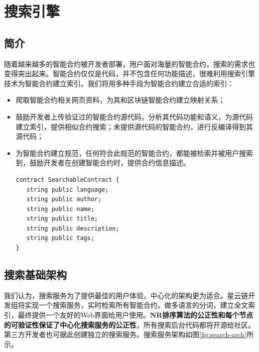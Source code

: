 \section{搜索引擎}
\label{sec:search}

\subsection{简介}

随着越来越多的智能合约被开发者部署，用户面对海量的智能合约，搜索的需求也变得突出起来。智能合约仅仅是代码，并不包含任何功能描述，很难利用搜索引擎技术为智能合约建立索引。我们将用多种手段为智能合约建立合适的索引：
\begin{itemize}
	\item 爬取智能合约相关网页资料，为其和区块链智能合约建立映射关系；
	\item 鼓励开发者上传验证过的智能合约源代码，分析其代码功能和语义，为源代码建立索引，提供相似合约搜索；未提供源代码的智能合约，进行反编译得到其源代码；
	\item 为智能合约建立规范，任何符合此规范的智能合约，都能被检索并被用户搜索到，鼓励开发者在创建智能合约时，提供合约信息描述。
	\begin{lstlisting}[frame=single]
contract SearchableContract {
   string public language;
   string public author;
   string public name;
   string public title;
   string public description;
   string public tags;
}
	\end{lstlisting}
\end{itemize}

\subsection{搜索基础架构}

我们认为，搜索服务为了提供最佳的用户体验，中心化的架构更为适合。星云链开发组将实现一个搜索服务，实时检索所有智能合约，做多语言的分词，建立全文索引，最终提供一个友好的Web界面给用户使用。\textbf{NR排序算法的公正性和每个节点的可验证性保证了中心化搜索服务的公正性}，所有搜索后台代码都将开源给社区。第三方开发者也可据此创建独立的搜索服务。搜索服务架构如图\ref{fig:search-arch}所示。

